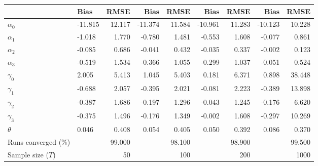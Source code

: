 
\begin{tabular}[t]{llrrrrrrr}
\toprule
  & Bias & RMSE & Bias & RMSE & Bias & RMSE & Bias & RMSE\\
\midrule
$\alpha_{0}$ & -11.815 & 12.117 & -11.374 & 11.584 & -10.961 & 11.283 & -10.123 & 10.228\\
$\alpha_{1}$ & -1.018 & 1.770 & -0.780 & 1.481 & -0.553 & 1.608 & -0.077 & 0.861\\
$\alpha_{2}$ & -0.085 & 0.686 & -0.041 & 0.432 & -0.035 & 0.337 & -0.002 & 0.123\\
$\alpha_{3}$ & -0.519 & 1.534 & -0.366 & 1.055 & -0.299 & 1.037 & -0.051 & 0.524\\
$\gamma_{0}$ & 2.005 & 5.413 & 1.045 & 5.403 & 0.181 & 6.371 & 0.898 & 38.448\\
$\gamma_{1}$ & -0.688 & 2.057 & -0.395 & 2.021 & -0.081 & 2.223 & -0.389 & 13.898\\
$\gamma_{2}$ & -0.387 & 1.686 & -0.197 & 1.296 & -0.043 & 1.245 & -0.176 & 6.620\\
$\gamma_{3}$ & -0.375 & 1.496 & -0.176 & 1.349 & -0.002 & 1.608 & -0.297 & 10.269\\
$\theta$ & 0.046 & 0.408 & 0.054 & 0.405 & 0.050 & 0.392 & 0.086 & 0.370\\
Runs converged (\%) &  & 99.000 &  & 98.100 &  & 98.900 &  & 99.500\\
Sample size ($T$) &  & 50 &  & 100 &  & 200 &  & 1000\\
\bottomrule
\end{tabular}
